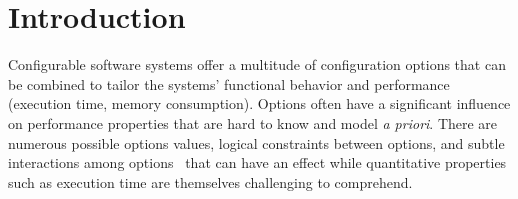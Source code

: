 \section{Introduction}
\label{sec:introduction}

Configurable software systems offer a multitude of configuration options that can be combined to tailor the systems’ functional behavior and performance (\eg execution time, memory consumption).
  Options often have a significant influence on performance properties that are hard to know and model \emph{a priori}. There are numerous possible options values, logical constraints between options, and subtle interactions among options~\cite{julianasurvey,guo2013ASE,sarkar2015,siegmund2015FSE,kaltenecker2019} that can have an effect while quantitative properties such as execution time are themselves challenging to comprehend. 


